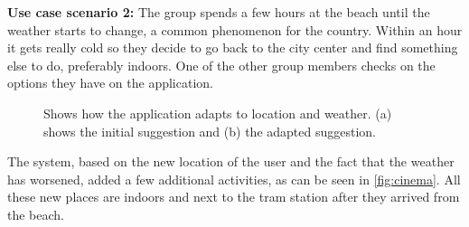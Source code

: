 \documentclass[11pt,a4paper,oneside]{article}
\begin{document}
\textbf{Use case scenario 2:} The group spends a few hours at the beach until the weather starts to change, a common phenomenon for the country.  Within an hour it gets really cold so they decide to go back to the city center and find something else to do, preferably indoors. One of the other group members checks on the options they have on the application. 
\begin{figure}[H]
    \centering
    \qquad
    \caption{Shows how the application adapts to location and weather. (a) shows the initial suggestion and (b) the adapted suggestion.}
    \label{fig:cinema}
\end{figure}
The system, based on the new location of the user and the fact that the weather has worsened, added a few additional activities, as can be seen in \autoref{fig:cinema}. All these new places are indoors and next to the tram station after they arrived from the beach.
\end{document}
